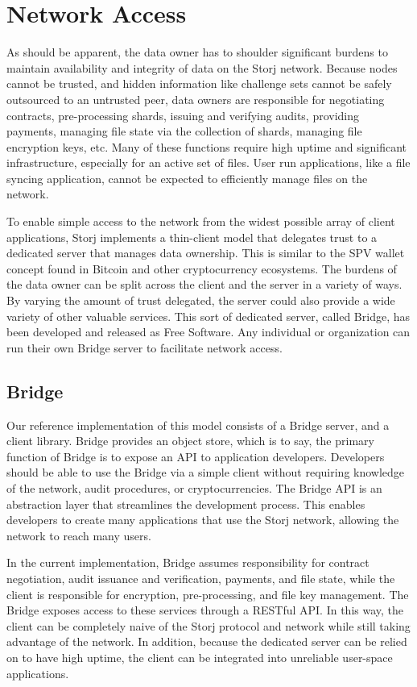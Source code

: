 \documentclass[a4paper,10pt]{article}
\begin{document}
\section{Network Access}
As should be apparent, the data owner has to shoulder significant burdens to maintain availability and integrity of data on the Storj network. Because nodes cannot be trusted, and hidden information like challenge sets cannot be safely outsourced to an untrusted peer, data owners are responsible for negotiating contracts, pre-processing shards, issuing and verifying audits, providing payments, managing file state via the collection of shards, managing file encryption keys, etc. Many of these functions require high uptime and significant infrastructure, especially for an active set of files. User run applications, like a file syncing application, cannot be expected to efficiently manage files on the network.

To enable simple access to the network from the widest possible array of client applications, Storj implements a thin-client model that delegates trust to a dedicated server that manages data ownership. This is similar to the SPV wallet concept found in Bitcoin and other cryptocurrency ecosystems. The burdens of the data owner can be split across the client and the server in a variety of ways. By varying the amount of trust delegated, the server could also provide a wide variety of other valuable services. This sort of dedicated server, called Bridge, has been developed and released as Free Software. Any individual or organization can run their own Bridge server to facilitate network access.

\subsection{Bridge}
Our reference implementation of this model consists of a Bridge server, and a client library. Bridge provides an object store, which is to say, the primary function of Bridge is to expose an API to application developers. Developers should be able to use the Bridge via a simple client without requiring knowledge of the network, audit procedures, or cryptocurrencies. The Bridge API is an abstraction layer that streamlines the development process. This enables developers to create many applications that use the Storj network, allowing the network to reach many users.

In the current implementation, Bridge assumes responsibility for contract negotiation, audit issuance and verification, payments, and file state, while the client is responsible for encryption, pre-processing, and file key management. The Bridge exposes access to these services through a RESTful API. In this way, the client can be completely naive of the Storj protocol and network while still taking advantage of the network. In addition, because the dedicated server can be relied on to have high uptime, the client can be integrated into unreliable user-space applications.
\end{document}
